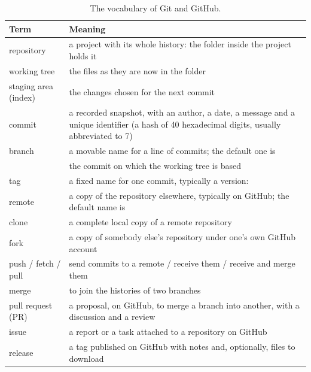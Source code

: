 \begin{table}[htb]
\centering\small
\caption{The vocabulary of Git and GitHub.}\label{tab:git:terms}
\begin{tabularx}{\textwidth}{@{}lL@{}}
\toprule
\textbf{Term} & \textbf{Meaning}\\
\midrule
repository & a project with its whole history: the folder  inside the project holds it\\
working tree & the files as they are now in the folder\\
staging area (index) & the changes chosen for the next commit\\
commit & a recorded snapshot, with an author, a date, a message and a unique identifier (a hash of 40 hexadecimal digits, usually abbreviated to 7)\\
branch & a movable name for a line of commits; the default one is \\
 & the commit on which the working tree is based\\
tag & a fixed name for one commit, typically a version: \\
remote & a copy of the repository elsewhere, typically on GitHub; the default name is \\
clone & a complete local copy of a remote repository\\
fork & a copy of somebody else's repository under one's own GitHub account\\
push / fetch / pull & send commits to a remote / receive them / receive and merge them\\
merge & to join the histories of two branches\\
pull request (PR) & a proposal, on GitHub, to merge a branch into another, with a discussion and a review\\
issue & a report or a task attached to a repository on GitHub\\
release & a tag published on GitHub with notes and, optionally, files to download\\
\bottomrule
\end{tabularx}
\end{table}

